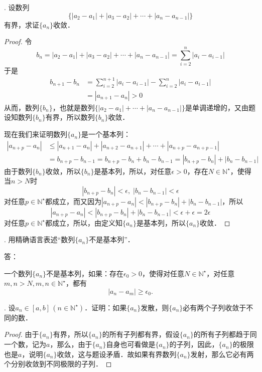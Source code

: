 \documentclass{ctexart}
\theoremstyle{definition}
\theoremstyle{definition}
\theoremstyle{plain}
\theoremstyle{plain}
\theoremstyle{plain}
\theoremstyle{definition}
\begin{document}
. 设数列
\begin{equation}
    \{|a_2-a_1|+|a_3-a_2|+\cdots+|a_n-a_{n-1}|\}
\end{equation}
有界，求证$\{a_n\}$收敛．
\begin{proof}
令
\begin{equation}
    b_n = |a_2-a_1|+|a_3-a_2|+\cdots+|a_n-a_{n-1}| =\sum_{i=2}^n |a_{i}-a_{i-1}|
\end{equation}
于是
\begin{align}
    b_{n+1}-b_n &= \sum_{i=2}^{n+1} |a_i - a_{i-1}| -\sum_{i=2}^{n} |a_i-a_{i-1}| \\
    &= |a_{n+1}-a_{n}| > 0
\end{align}
从而，数列$\{b_n\}$，也就是数列$\{|a_2-a_1|+\cdots+|a_{n}-a_{n-1}|\}$是单调递增的，又由题设知数列$\{b_n\}$有界，所以数列$\{b_n\}$收敛．

\noindent 现在我们来证明数列$\{a_n\}$是一个基本列：
\begin{align}
    |a_{n+p}-a_n| &\leq |a_{n+1}-a_n|+|a_{n+2}-a_{n+1}|+\cdots+|a_{n+p}-a_{n+p-1}| \\
    &= b_{n+p} - b_{n-1} = b_{n+p} - b_n + b_{n} - b_{n-1} = |b_{n+p}-b_n|+|b_n-b_{n-1}|
\end{align}
由于数列$\{b_n\}$收敛，所以$\{b_n\}$是基本列，所以，对任意$\epsilon > 0$，存在$N\in\mathbb{N}^\star$，使得当$n > N$时
\begin{equation}
    |b_{n+p}-b_n|<\epsilon, \; |b_n-b_{n-1}|<\epsilon
\end{equation}
对任意$p \in \mathbb{N}^\star$都成立，而又因为$|a_{n+p}-a_n|<|b_{n+p} - b_n|+|b_{n}-b_{n-1}|$，所以
\begin{equation}
    |a_{n+p}-a_n|<|b_{n+p}-b_n|+|b_n-b_{n-1}|<\epsilon+\epsilon=2\epsilon
\end{equation}
对任意$p\in\mathbb{N}^\star$都成立，所以，由定义知$\{a_n\}$是基本列，所以$\{a_n\}$收敛．
\end{proof}
. 用精确语言表述``数列$\{a_n\}$不是基本列''．

\noindent 答：

\noindent 一个数列$\{a_n\}$不是基本列，如果：存在$\epsilon_0 > 0$，使得对任意$N \in \mathbb{N}^\star$，对任意$m,n > N, m,n \in \mathbb{N}^\star$，都有
\begin{equation}
    |a_n - a_m| \geq \epsilon_0.
\end{equation}

. 设$a_n \in [a,b]\,(n\in\mathbb{N}^\star)$．证明：如果$\{a_n\}$发散，则$\{a_n\}$必有两个子列收敛于不同的数．
\begin{proof}
由于$\{a_n\}$有界，所以$\{a_n\}$的所有子列都有界，假设$\{a_n\}$的所有子列都趋于同一个数，记为$a$，那么，由于$\{a_n\}$自身也可看做是$\{a_n\}$的子列，因此，$\{a_n\}$的极限也是$a$，说明$\{a_n\}$收敛，这与题设矛盾．故如果有界数列$\{a_n\}$发射，那么它必有两个分别收敛到不同极限的子列．
\end{proof}
\end{document}
